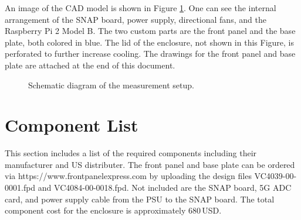 \documentclass[12pt,a4paper,oneside]{article}
\begin{document}
An image of the CAD model is shown in Figure \ref{fig:CAD-model}. One can see the internal arrangement of the SNAP board, power supply, directional fans, and the Raspberry Pi 2 Model B. The two custom parts are the front panel and the base plate, both colored in blue. The lid of the enclosure, not shown in this Figure, is perforated to further increase cooling. The drawings for the front panel and base plate are attached at the end of this document.


%
\begin{figure}[H]
\caption{Schematic diagram of the measurement setup.}
\label{fig:CAD-model}
\end{figure}
%

\newpage

\section{Component List}
\label{sec:3}
This section includes a list of the required components including their manufacturer and US distributer. The front panel and base plate can be ordered via {\color{blue} https://www.frontpanelexpress.com} by uploading the design files {\color{blue} VC4039-00-0001.fpd} and {\color{blue} VC4084-00-0018.fpd}. Not included are the SNAP board, 5G ADC card, and power supply cable from the PSU to the SNAP board. The total component cost for the enclosure is approximately 680\,USD.
\end{document}

